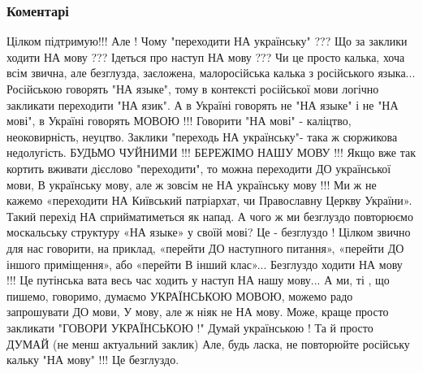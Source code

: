  
 
 
 
 
\subsubsection{Коментарі}

\begin{itemize}
 

\obeycr
Цілком підтримую!!!
Але !
Чому
"переходити НА українську" ???
Що за заклики
ходити НА мову ???
Ідеться про наступ НА мову ???
Чи це просто
калька,
хоча всім звична,
але безглузда,
заєложена,
малоросійська калька
з російського языка...
Російською говорять "НА языке", тому в контексті російської мови логічно закликати переходити "НА язик".
А в Україні говорять не "НА языке" і не "НА мові",
в Україні говорять МОВОЮ !!!
Говорити "НА мові" - каліцтво, неоковирність, неуцтво.
Заклики "переходь НА українську"- така ж сюржикова недолугість.
БУДЬМО ЧУЙНИМИ !!!
БЕРЕЖІМО НАШУ МОВУ !!!
Якщо вже так кортить вживати дієслово "переходити",
то можна переходити
ДО української мови, В українську мову,
але ж зовсім не НА українську мову !!!
Ми ж не кажемо
«переходити НА Київський патріархат,
чи Православну Церкву України».
Такий перехід НА сприйматиметься як напад.
А чого ж ми безглуздо повторюємо
москальську структуру
«НА языке»
у своїй мові?
Це - безглуздо !
Цілком звично для нас говорити,
на приклад,
«перейти ДО наступного питання»,
«перейти ДО іншого приміщення»,
або
«перейти В інший клас»...
Безглуздо ходити НА мову !!!
Це путінська вата
весь час ходить у наступ
НА нашу мову...
А ми,
ті , що
пишемо,
говоримо,
думаємо
УКРАЇНСЬКОЮ МОВОЮ,
можемо радо запрошувати
ДО мови, У мову,
але ж ніяк не НА мову.
Може, краще просто закликати
"ГОВОРИ УКРАЇНСЬКОЮ !"
Думай українською !
Та й просто ДУМАЙ
(не менш актуальний заклик)
Але, будь ласка, не повторюйте російську кальку "НА мову" !!!
Це безглуздо.
\restorecr


\end{itemize}
